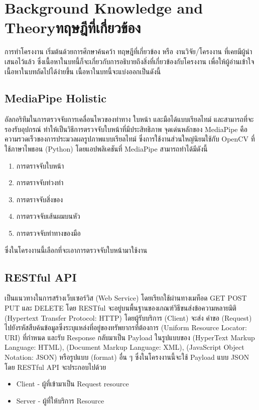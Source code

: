 \chapter{\ifenglish Background Knowledge and Theory\else ทฤษฎีที่เกี่ยวข้อง\fi}

การทำโครงงาน เริ่มต้นด้วยการศึกษาค้นคว้า ทฤษฎีที่เกี่ยวข้อง หรือ งานวิจัย/โครงงาน ที่เคยมีผู้นำเสนอไว้แล้ว ซึ่งเนื้อหาในบทนี้ก็จะเกี่ยวกับการอธิบายถึงสิ่งที่เกี่ยวข้องกับโครงงาน 
เพื่อให้ผู้อ่านเข้าใจเนื้อหาในบทถัดไปได้ง่ายขึ้น เนื้อหาในบทนี้จะแบ่งออกเป็นดังนี้

\section{MediaPipe Holistic}
อัลกอริทึมในการตรวจจับการเคลื่อนไหวของท่าทาง ใบหน้า และมือได้แบบเรียลไทม์ และสามารถที่จะรองรับอุปกรณ์
ทำให้เป็นวิธีการตรวจจับใบหน้าที่มีประสิทธิภาพ จุดเด่นหลักของ MediaPipe คือความรวดเร็วของการประมวลผลรูปภาพแบบเรียลไทม์
ซึ่งการใช้งานส่วนใหญ่นิยมใช้กับ OpenCV ที่ใช้ภาษาไพธอน (Python) \cite{Mediapipe} โดยแอปพลิเคชันที่ MediaPipe สามารถทำได้มีดังนี้
\begin{enumerate}
  \item การตราจจับใบหน้า
  \item การตราจจับท่วงท่า
  \item การตราจจับสิ่งของ
  \item การตรวจจับเส้นผมบนหัว
  \item การตรวจจับท่าทางของมือ
\end{enumerate}
ซึ่งในโครงงานนี้เลือกที่จะเอาการตรวจจับใบหน้ามาใช้งาน

\section{RESTful API}
เป็นแนวทางในการสร้างเว็บเซอร์วิส (Web Service) โดยเรียกใช้ผ่านทางเมท็อด GET POST PUT และ DELETE
โดย RESTful จะอยู่บนพื้นฐานของเกณฑ์วิธีขนส่งข้อความหลายมิติ (Hypertext Transfer Protocol: HTTP) โดยผู้รับบริการ (Client) จะส่ง
คำขอ (Request) ไปยังรหัสสืบค้นข้อมูลซึ่งระบุแหล่งที่อยู่ของทรัพยากรที่ต้องการ (Uniform Resource Locator: URI) ที่กำหนด และรับ Response กลับมาเป็น Payload 
ในรูปแบบของ (HyperText Markup Language: HTML), (Document Markup Language: XML), (JavaScript Object Notation: JSON) หรือรูปแบบ (format) อื่น ๆ \cite{REST}
ซึ่งในโครงงานนี้จะใช้ Payload แบบ JSON โดย RESTful API จะประกอบไปด้วย
\begin{itemize}
  \item Client - ผู้ที่เข้ามาเป็น Request resource
  \item Server - ผู้ที่ให้บริการ Resource
\end{itemize}
\cleardoublepage


